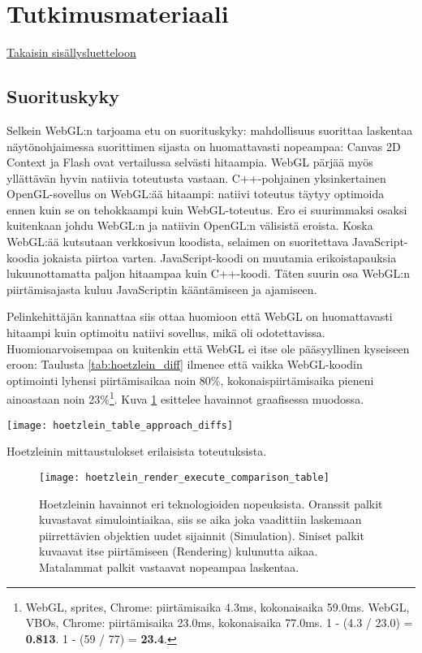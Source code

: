 \section{Tutkimusmateriaali}
\label{sec:materiaali}
\hyperlink{index}{Takaisin sisällysluetteloon}
\subsection{Suorituskyky}
Selkein WebGL:n tarjoama etu on suorituskyky: mahdollisuus suorittaa laskentaa näytönohjaimessa suorittimen sijasta on huomattavasti nopeampaa: Canvas 2D Context ja Flash ovat vertailussa selvästi hitaampia\cite{hoetzlein}. WebGL pärjää myös yllättävän hyvin natiivia toteutusta vastaan. C++-pohjainen yksinkertainen OpenGL-sovellus on WebGL:ää hitaampi: natiivi toteutus täytyy optimoida ennen kuin se on tehokkaampi kuin WebGL-toteutus\cite{hoetzlein}. Ero ei suurimmaksi osaksi kuitenkaan johdu WebGL:n ja natiivin OpenGL:n välisistä eroista. Koska WebGL:ää kutsutaan verkkosivun koodista, selaimen on suoritettava JavaScript-koodia jokaista piirtoa varten. JavaScript-koodi on muutamia erikoistapauksia lukuunottamatta paljon hitaampaa kuin C++-koodi\cite{smedberg}. Täten suurin osa WebGL:n piirtämisajasta kuluu JavaScriptin kääntämiseen ja ajamiseen\cite{hoetzlein}.

Pelinkehittäjän kannattaa siis ottaa huomioon että WebGL on huomattavasti hitaampi kuin optimoitu natiivi sovellus, mikä oli odotettavissa. Huomionarvoisempaa on kuitenkin että WebGL ei itse ole pääsyyllinen kyseiseen eroon: Taulusta \ref{tab:hoetzlein_diff} ilmenee että vaikka WebGL-koodin optimointi lyhensi piirtämisaikaa noin 80\%, kokonaispiirtämisaika pieneni ainoastaan noin 23\%\footnote{WebGL, sprites, Chrome: piirtämisaika 4.3ms, kokonaisaika 59.0ms. WebGL, VBOs, Chrome: piirtämisaika 23.0ms, kokonaisaika 77.0ms. 1 - (4.3 / 23.0) = \textbf{0.813}. 1 - (59 / 77) = \textbf{23.4}.}. Kuva \ref{fig:hoetzlein_comparison} esittelee havainnot graafisessa muodossa.

\begin{table}[h]
    \texttt{[image: hoetzlein\_table\_approach\_diffs]}
    \caption{\label{tab:hoetzlein_diff}Hoetzleinin\cite{hoetzlein} mittaustulokset erilaisista toteutuksista.}
\end{table}

\begin{figure}[h]
    \texttt{[image: hoetzlein\_render\_execute\_comparison\_table]}
    \caption{\label{fig:hoetzlein_comparison}Hoetzleinin\cite{hoetzlein} havainnot eri teknologioiden nopeuksista. Oranssit palkit kuvastavat simulointiaikaa, siis se aika joka vaadittiin laskemaan piirrettävien objektien uudet sijainnit (Simulation). Siniset palkit kuvaavat itse piirtämiseen (Rendering) kulunutta aikaa. Matalammat palkit vastaavat nopeampaa laskentaa.}
\end{figure}

